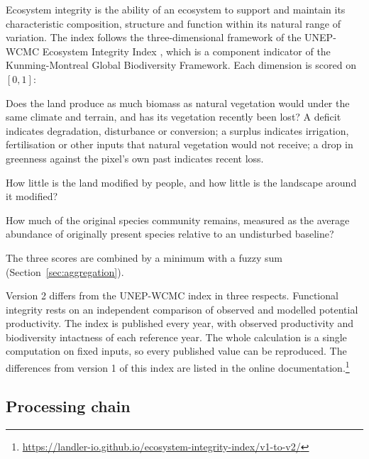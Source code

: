 \documentclass[11pt,a4paper]{article}
\begin{document}
Ecosystem integrity is the ability of an ecosystem to support and maintain its characteristic
composition, structure and function within its natural range of variation. The index follows
the three-dimensional framework of the UNEP-WCMC Ecosystem Integrity Index
\citep{hill2026}, which is a component indicator of the Kunming-Montreal Global Biodiversity
Framework. Each dimension is scored on $[0,1]$:

\begin{description}[leftmargin=1.2em]
\item[Function ($F$).] Does the land produce as much biomass as natural vegetation would under
the same climate and terrain, and has its vegetation recently been lost? A deficit indicates
degradation, disturbance or conversion; a surplus indicates irrigation, fertilisation or other
inputs that natural vegetation would not receive; a drop in greenness against the pixel's own
past indicates recent loss.
\item[Structure ($S$).] How little is the land modified by people, and how little is the
landscape around it modified?
\item[Composition ($C$).] How much of the original species community remains, measured as the
average abundance of originally present species relative to an undisturbed baseline?
\end{description}

\noindent The three scores are combined by a minimum with a fuzzy sum
(Section~\ref{sec:aggregation}).

Version 2 differs from the UNEP-WCMC index in three respects. Functional integrity rests on an
independent comparison of observed and modelled potential productivity. The index is published
every year, with observed productivity and biodiversity intactness of each reference year. The
whole calculation is a single computation on fixed inputs, so every published value can be
reproduced. The differences from version 1 of this index are listed in the online
documentation.\footnote{\url{https://landler-io.github.io/ecosystem-integrity-index/v1-to-v2/}}

\subsection{Processing chain}
\end{document}
